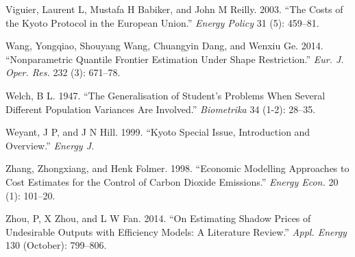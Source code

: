 \documentclass[
  10pt,
]{article}
\begin{document}
\leavevmode\hypertarget{ref-Viguier2003}{}%
Viguier, Laurent L, Mustafa H Babiker, and John M Reilly. 2003. ``The
Costs of the Kyoto Protocol in the European Union.'' \emph{Energy
Policy} 31 (5): 459--81.

\leavevmode\hypertarget{ref-Wang2014}{}%
Wang, Yongqiao, Shouyang Wang, Chuangyin Dang, and Wenxiu Ge. 2014.
``Nonparametric Quantile Frontier Estimation Under Shape Restriction.''
\emph{Eur. J. Oper. Res.} 232 (3): 671--78.

\leavevmode\hypertarget{ref-Welch1947}{}%
Welch, B L. 1947. ``The Generalisation of Student's Problems When
Several Different Population Variances Are Involved.'' \emph{Biometrika}
34 (1-2): 28--35.

\leavevmode\hypertarget{ref-Weyant1999}{}%
Weyant, J P, and J N Hill. 1999. ``Kyoto Special Issue, Introduction and
Overview.'' \emph{Energy J.}

\leavevmode\hypertarget{ref-Zhang1998}{}%
Zhang, Zhongxiang, and Henk Folmer. 1998. ``Economic Modelling
Approaches to Cost Estimates for the Control of Carbon Dioxide
Emissions.'' \emph{Energy Econ.} 20 (1): 101--20.

\leavevmode\hypertarget{ref-Zhou2014}{}%
Zhou, P, X Zhou, and L W Fan. 2014. ``On Estimating Shadow Prices of
Undesirable Outputs with Efficiency Models: A Literature Review.''
\emph{Appl. Energy} 130 (October): 799--806.
\end{document}
